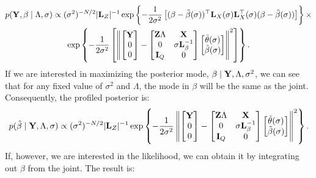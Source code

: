 \documentclass[10pt]{article}
\begin{document}
\begin{multline*}
p({\bf Y}, \beta \mid \Lambda, \sigma) \propto
(\sigma^2)^{-N/2}|{\bf L}_Z|^{-1}
\exp\left\{-\frac{1}{2\sigma^2}\left[
(\beta - \tilde\beta(\sigma))^\top{\bf L}_X(\sigma){\bf L}_X^\top(\sigma)
(\beta - \tilde\beta(\sigma)) \right]\right\} \times\\
% 
\exp\left\{-\frac{1}{2\sigma^2}\left[
\left\|
\begin{bmatrix}{\bf Y} \\ 0 \\ 0 \end{bmatrix} -
\begin{bmatrix}{\bf Z}\Lambda & {\bf X} \\
0 & \sigma{\bf L}^{-1}_\beta \\
{\bf I}_Q & 0
\end{bmatrix}
\begin{bmatrix} \tilde\theta(\sigma) \\ \tilde\beta(\sigma) \end{bmatrix}
\right\|^2\right]\right\}.
\end{multline*}
If we are interested in maximizing the posterior mode, $\beta \mid
{\bf Y}, \Lambda, \sigma^2$, we can see that for any fixed value of
$\sigma^2$ and $\Lambda$, the mode in $\beta$ will be the same as the
joint. Consequently, the profiled posterior is:
\begin{equation*}
p(\hat{\beta} \mid {\bf Y}, \Lambda, \sigma) \propto
(\sigma^2)^{-N/2}|{\bf L}_Z|^{-1}
\exp\left\{-\frac{1}{2\sigma^2}
\left\|
\begin{bmatrix}{\bf Y} \\ 0 \\ 0 \end{bmatrix} -
\begin{bmatrix}{\bf Z}\Lambda & {\bf X} \\
0 & \sigma{\bf L}^{-1}_\beta \\
{\bf I}_Q & 0
\end{bmatrix}
\begin{bmatrix} \tilde\theta(\sigma) \\ \tilde\beta(\sigma) \end{bmatrix}
\right\|^2
\right\}.
\end{equation*}
If, however, we are interested in the likelihood, we can obtain it by
integrating out $\beta$ from the joint. The result is:
\end{document}
